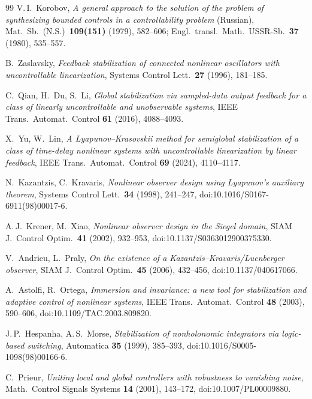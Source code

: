 \documentclass[11pt,reqno]{amsart}
\theoremstyle{plain}
\theoremstyle{definition}
\theoremstyle{remark}
\begin{document}
\begin{thebibliography}{99}
 V.\,I.~Korobov,
  \emph{A general approach to the solution of the problem of synthesizing bounded
  controls in a controllability problem} \textup{(Russian)}, Mat.\ Sb.\ (N.S.)\
  \textbf{109(151)} (1979), 582--606; Engl.\ transl.\ Math.\ USSR-Sb.\ \textbf{37}
  (1980), 535--557.

 B.~Zaslavsky,
  \emph{Feedback stabilization of connected nonlinear oscillators with
  uncontrollable linearization}, Systems Control Lett.\ \textbf{27} (1996), 181--185.

 C.~Qian, H.~Du, S.~Li,
  \emph{Global stabilization via sampled-data output feedback for a class of linearly uncontrollable and
  unobservable systems}, IEEE Trans.\ Automat.\ Control \textbf{61} (2016), 4088--4093.

 X.~Yu, W.~Lin,
  \emph{A Lyapunov--Krasovskii method for semiglobal stabilization of a class of time-delay nonlinear systems
  with uncontrollable linearization by linear feedback}, IEEE Trans.\ Automat.\ Control \textbf{69} (2024),
  4110--4117.

 N.~Kazantzis, C.~Kravaris,
  \emph{Nonlinear observer design using Lyapunov's auxiliary theorem},
  Systems Control Lett.\ \textbf{34} (1998), 241--247, doi:10.1016/S0167-6911(98)00017-6.

 A.\,J.~Krener, M.~Xiao,
  \emph{Nonlinear observer design in the Siegel domain},
  SIAM J.\ Control Optim.\ \textbf{41} (2002), 932--953, doi:10.1137/S0363012900375330.

 V.~Andrieu, L.~Praly,
  \emph{On the existence of a Kazantzis--Kravaris/Luenberger observer},
  SIAM J.\ Control Optim.\ \textbf{45} (2006), 432--456, doi:10.1137/040617066.

 A.~Astolfi, R.~Ortega,
  \emph{Immersion and invariance: a new tool for stabilization and adaptive control of nonlinear systems},
  IEEE Trans.\ Automat.\ Control \textbf{48} (2003), 590--606, doi:10.1109/TAC.2003.809820.

 J.\,P.~Hespanha, A.\,S.~Morse,
  \emph{Stabilization of nonholonomic integrators via logic-based switching},
  Automatica \textbf{35} (1999), 385--393, doi:10.1016/S0005-1098(98)00166-6.

 C.~Prieur,
  \emph{Uniting local and global controllers with robustness to vanishing noise},
  Math.\ Control Signals Systems \textbf{14} (2001), 143--172, doi:10.1007/PL00009880.


\end{thebibliography}
\end{document}
